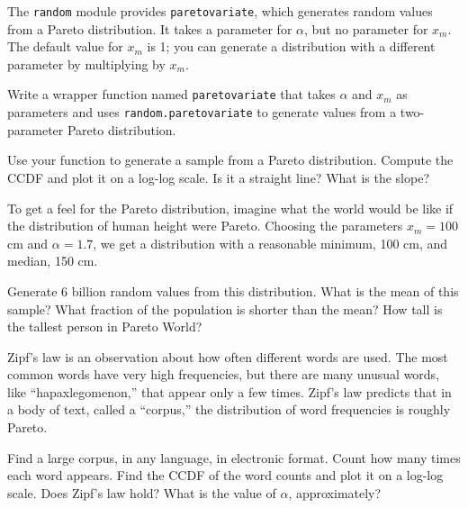 \documentclass[12pt]{book}
\begin{document}
\begin{ex}

The {\tt random} module provides {\tt paretovariate},
which generates random values from a Pareto distribution.  It takes
a parameter for $\alpha$, but no parameter for $x_m$.  The
default value for $x_m$ is 1; you can generate a distribution
with a different parameter by multiplying by $x_m$.


Write a wrapper function named {\tt paretovariate} that takes $\alpha$
and $x_m$ as parameters and uses {\tt random.paretovariate} to
generate values from a two-parameter Pareto distribution.

Use your function to generate a sample from a Pareto distribution.
Compute the CCDF and plot it on a log-log scale.  Is it a straight
line?  What is the slope?


\end{ex}

\begin{ex}

To get a feel for the Pareto distribution, imagine what the world
would be like if the distribution of human height were Pareto.
Choosing the parameters $x_m = 100$ cm and $\alpha = 1.7$, we
get a distribution with a reasonable minimum, 100 cm,
and median, 150 cm.


Generate 6 billion random values from this distribution.  What is the
mean of this sample?  What fraction of the population is shorter than
the mean?  How tall is the tallest person in Pareto World?


\end{ex}

\begin{ex}

Zipf's law is an observation about how often different words are used.
The most common words have very high frequencies, but there are many
unusual words, like ``hapaxlegomenon,'' that appear only a few times.
Zipf's law predicts that in a body of text, called a ``corpus,'' the
distribution of word frequencies is roughly Pareto.


Find a large corpus, in any language, in electronic
format.  Count how many times each word appears.  Find the CCDF of the
word counts and plot it on a log-log scale.  Does Zipf's law hold?
What is the value of $\alpha$, approximately?


\end{ex}
\end{document}
